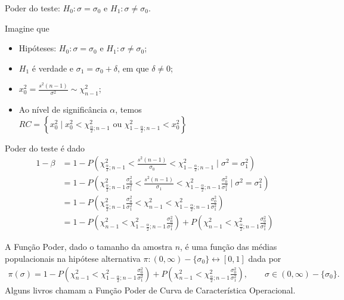 \documentclass[8pt]{beamer}
\begin{document}
\begin{frame}{Poder do teste: $H_0: \sigma = \sigma_0$ e $H_1: \sigma \neq \sigma_0$.}

\scriptsize

Imagine que
\begin{itemize}
	\item Hipóteses: $H_0: \sigma=\sigma_0$ e $H_1: \sigma \neq \sigma_0$;
	\item $H_1$ é verdade e $\sigma_1 = \sigma_0 + \delta$, em que $\delta \neq 0$;
	\item $x_0^2 = \frac{s^2(n-1)}{\sigma^2} \sim \chi_{n-1}^2$;
	\item Ao nível de significância $\alpha$, temos $RC=\left\{ x_0^2 \mid x_0^2 < \chi_{\frac{\alpha}{2};n-1}^2 \mbox{ ou } \chi_{1-\frac{\alpha}{2};n-1}^2 < x_0^2  \right\}$
\end{itemize}
\vfill

Poder do teste é dado
\begin{align*}
	1-\beta &= 1- P\left( \chi_{\frac{\alpha}{2};n-1}^2 < \frac{s^2(n-1)}{\sigma_0} < \chi_{1-\frac{\alpha}{2};n-1}^2 \mid \sigma^2 = \sigma_1^2  \right)\\
	&=1- P \left( \chi_{\frac{\alpha}{2};n-1}^2 \frac{\sigma_0^2}{\sigma_1^2} < \frac{s^2(n-1)}{\sigma_1} < \chi_{1-\frac{\alpha}{2};n-1}^2 \frac{\sigma_0^2}{\sigma_1^2} \mid \sigma^2 = \sigma_1^2  \right)\\
	&=1- P \left( \chi_{\frac{\alpha}{2};n-1}^2 \frac{\sigma_0^2}{\sigma_1^2} < \chi_{n-1}^2 < \chi_{1-\frac{\alpha}{2};n-1}^2 \frac{\sigma_0^2}{\sigma_1^2} \right)\\
	&=1- P \left( \chi_{n-1}^2 < \chi_{1-\frac{\alpha}{2};n-1}^2 \frac{\sigma_0^2}{\sigma_1^2} \right) + P \left( \chi_{n-1}^2 < \chi_{\frac{\alpha}{2};n-1}^2 \frac{\sigma_0^2}{\sigma_1^2} \right)
\end{align*}
\vfill

A \textcolor{important}{Função Poder}, dado o tamanho da amostra $n$, é uma função das médias populacionais na hipótese alternativa $\pi: (0,\infty) -\{\sigma_0\} \longleftrightarrow [0,1]$ dada por
\begin{align*}
	\pi(\sigma) = 1- P \left( \chi_{n-1}^2 < \chi_{1-\frac{\alpha}{2};n-1}^2 \frac{\sigma_0^2}{\sigma_1^2} \right) + P \left( \chi_{n-1}^2 < \chi_{\frac{\alpha}{2};n-1}^2 \frac{\sigma_0^2}{\sigma_1^2} \right), \qquad \sigma \in  (0,\infty) -\{\sigma_0\}.
\end{align*}
Alguns livros chamam a Função Poder de \textcolor{important}{Curva de Característica Operacional.}
\end{frame}
\end{document}
